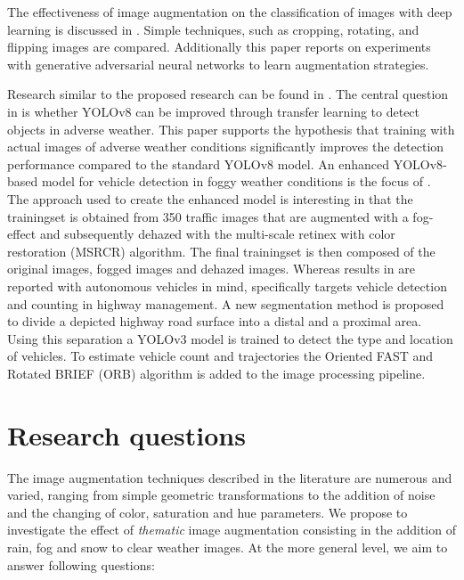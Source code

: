 \documentclass[]{article}
\begin{document}
	The effectiveness of image augmentation on the classification of images with deep learning is discussed in \cite{perezEffectivenessDataAugmentation2017}. Simple techniques, such as cropping, rotating, and flipping images are compared. Additionally this paper reports on experiments with generative adversarial neural networks to learn augmentation strategies.
	
	Research similar to the proposed research can be found in \cite{kumarObjectDetectionAdverse2023}. The central question in \cite{kumarObjectDetectionAdverse2023} is whether YOLO{\small v8} can be improved through transfer learning to detect objects in adverse weather. This paper supports the hypothesis that training with actual images of adverse weather conditions significantly improves the detection performance compared to the standard YOLO{\small v8} model. An enhanced YOLO\small{v8}-based model for vehicle detection in foggy weather conditions is the focus of \cite{liVehicleDetectionFoggy2022}. The approach used to create the enhanced model is interesting in that the trainingset is obtained from 350 traffic images that are augmented with a fog-effect and subsequently dehazed with the multi-scale retinex with color restoration (MSRCR) algorithm. The final trainingset is then composed of the original images, fogged images and dehazed images. Whereas results in \cite{liVehicleDetectionFoggy2022} are reported with autonomous vehicles in mind, \cite{songVisionbasedVehicleDetection2019} specifically targets vehicle detection and counting in highway management.  A new segmentation method is proposed to divide a depicted highway road surface into a distal and a proximal area. Using this separation a YOLO{\small v3} model is trained to detect the type and location of vehicles. To estimate vehicle count and trajectories the Oriented FAST and Rotated BRIEF (ORB) algorithm is added to the image processing pipeline.
	

\section{Research questions}

	The image augmentation techniques described in the literature are numerous and varied, ranging from simple geometric transformations to the addition of noise and the changing of color, saturation and hue parameters. We propose to investigate the effect of \textit{thematic} image augmentation consisting in the addition of rain, fog and snow to clear weather images. At the more general level, we aim to answer following questions:
\end{document}
